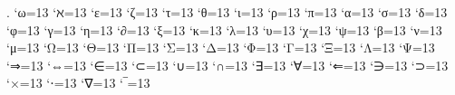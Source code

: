 \renewcommand*{\C}{\mathbb{C}}
\newcommand{\Q}{\mathbb{Q}}
\newcommand{\K}{\mathbb{K}}
\newcommand{\N}{\mathbb{N}}
\newcommand{\Z}{\mathbb{Z}}
\renewcommand{\AA}{\mathbb{A}}
\newcommand{\DD}{\mathbb{D}}
\newcommand{\MM}{\mathbb{M}}
\renewcommand{\a}{~\textnormal{\iflanguage{german}{auf}{on} }}
\renewcommand{\i}{~\textnormal{in }}
\newcommand{\ex}{~\textnormal{\iflanguage{german}{existiert}{exists} }}
\newcommand{\fa}{\quad\textnormal{\iflanguage{german}{für alle}{for all} }}
\newcommand{\st}{\quad\textnormal{s.t. }}
\newcommand{\f}{\quad\textnormal{\iflanguage{german}{für}{for} }}
\newcommand{\so}{\quad\textnormal{\iflanguage{german}{sonst}{else} }}
\newcommand{\fü}{\quad\textnormal{\iflanguage{german}{f.ü.}{a.e.} }}
\newcommand{\m}{~\textnormal{\iflanguage{german}{mit}{with} }}
\newcommand{\E}{\mathbbm{1}}
\renewcommand{\O}{\mathcal{O}}
\renewcommand{\Re}{\operatorname{Re}}
\renewcommand{\Im}{\operatorname{Im}}
\renewcommand{\O}{\mathcal{O}}
\newcommand{\RR}{\mathcal{R}}
\newcommand{\A}{\mathcal{A}}
\newcommand{\M}{\mathcal{M}}
\newcommand{\W}{\mathcal{W}}
\newcommand{\Schwarz}{\mathcal{S}}
\newcommand{\bepsilon}{\varepsilon}
\newcommand{\bphi}{\varphi}
\renewcommand{\epsilon}{\varepsilon}
\renewcommand{\arraystretch}{1.3}
\newcommand{\mydots}[1]{\IfBeginWith{#1}{,}{\ldots#1}{\cdots#1}}
\newcommand{\lt}{\left}
\newcommand{\rt}{\right}
\newcommand{\mt}{\middle}
\arraycolsep=2pt
\makeatletter
{}
 {\let\@ifnextchar\new@ifnextchar
  \left\lbrace
  \def\arraystretch{#2}%
  }
 {\endarray\right.}
\makeatother
\newcommand{\mat}[2][6pt]{\arraycolsep=#1\begin{pmatrix}#2\end{pmatrix}}
\newcommand{\smat}[1]{\left(\begin{smallmatrix}#1\end{smallmatrix}\right)}
\catcode`ω=13
\catcode`ℵ=13
\catcode`ε=13
\catcode`ζ=13
\catcode`τ=13
\catcode`θ=13
\catcode`ι=13
\catcode`ρ=13
\catcode`π=13
\catcode`α=13
\catcode`σ=13
\catcode`δ=13
\catcode`φ=13
\catcode`γ=13
\catcode`η=13
\catcode`∂=13
\catcode`ξ=13
\catcode`κ=13
\catcode`λ=13
\catcode`υ=13
\catcode`χ=13
\catcode`ψ=13
\catcode`β=13
\catcode`ν=13
\catcode`μ=13
\catcode`Ω=13
\catcode`Θ=13
\catcode`Π=13
\catcode`Σ=13
\catcode`Δ=13
\catcode`Φ=13
\catcode`Γ=13
\catcode`Ξ=13
\catcode`Λ=13
\catcode`Ψ=13
\catcode`⇒=13
\catcode`⇔=13
\catcode`∈=13
\catcode`⊂=13
\catcode`∪=13
\catcode`∩=13
\catcode`∃=13
\catcode`∀=13
\catcode`⇐=13
\catcode`∋=13
\catcode`⊃=13
\catcode`×=13
\catcode`⋅=13
\catcode`∇=13
\catcode`‾=13
